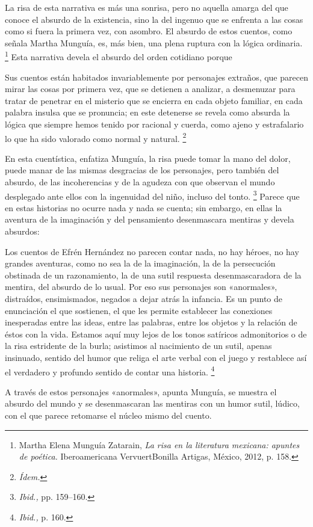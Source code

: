 \documentclass[14pt,twoside,final]{extbook} %
\let\oldfootnote\footnote
\renewcommand\footnote[1]{%
\oldfootnote{\hspace{1mm}#1}}
\begin{document}
La risa de esta narrativa es más una sonrisa, pero no aquella amarga del que conoce el absurdo de la existencia, sino la del ingenuo que se enfrenta a las cosas como si fuera la primera vez, con asombro. El absurdo de estos cuentos, como señala Martha Munguía, es, más bien, una plena ruptura con la lógica ordinaria.\footnote{Martha Elena Munguía Zatarain, \emph{La risa en la literatura mexicana: apuntes de poética.} Iberoamericana Vervuert\kernedslash Bonilla Artigas, México, 2012, p. 158.} Esta narrativa devela el absurdo del orden cotidiano porque
\begin{quoting}
Sus cuentos están habitados invariablemente por personajes extraños, que parecen mirar las cosas por primera vez, que se detienen a analizar, a desmenuzar para tratar de penetrar en el misterio que se encierra en cada objeto familiar, en cada palabra insulsa que se pronuncia; en este detenerse se revela como absurda la lógica que siempre hemos tenido por racional y cuerda, como ajeno y estrafalario lo que ha sido valorado como normal y natural.\footnote{\em Ídem.}
\end{quoting}
En esta cuentística, enfatiza Munguía, la risa puede tomar la mano del dolor, puede manar de las mismas desgracias de los personajes, pero también del absurdo, de las incoherencias y de la agudeza con que observan el mundo desplegado ante ellos con la ingenuidad del niño, incluso del tonto.\footnote{\emph{Ibid.,} pp. 159--160.} Parece que en estas historias no ocurre nada y nada se cuenta; sin embargo, en ellas la aventura de la imaginación y del pensamiento desenmascara mentiras y devela absurdos:
\begin{quoting}
Los cuentos de Efrén Hernández no parecen contar nada, no hay héroes, no hay grandes aventuras, como no sea la de la imaginación, la de la persecución obstinada de un razonamiento, la de una sutil respuesta desenmascaradora de la mentira, del absurdo de lo usual. Por eso sus personajes son «anormales», distraídos, ensimismados, negados a dejar atrás la infancia. Es un punto de enunciación el que sostienen, el que les permite establecer las conexiones inesperadas entre las ideas, entre las palabras, entre los objetos y la relación de éstos con la vida. Estamos aquí muy lejos de los tonos satíricos admonitorios o de la risa estridente de la burla; asistimos al nacimiento de un sutil, apenas insinuado, sentido del humor que religa el arte verbal con el juego y restablece así el verdadero y profundo sentido de contar una historia.\footnote{\emph{Ibid.,} p. 160.}
\end{quoting}
A través de estos personajes «anormales», apunta Munguía, se muestra el absurdo del mundo y se desenmascaran las mentiras con un humor sutil, lúdico, con el que parece retomarse el núcleo mismo del cuento.
\end{document}
